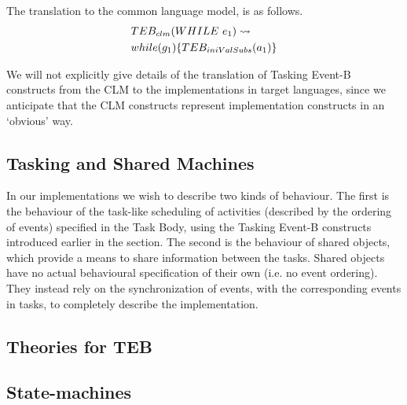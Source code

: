 The translation to the common language model, is as follows.
\begin{equation}
\begin{split}
&TEB_{clm}(WHILE~ e_1 ) \leadsto\\
& while(g_1)\{ TEB_{iniValSubs}(a_1) \}
\end{split}
\notag
\end{equation}

We will not explicitly give details of the translation of Tasking Event-B constructs from the CLM to the implementations in target languages, since we anticipate that the CLM constructs represent implementation constructs in an `obvious' way. 

\subsection{Tasking and Shared Machines}\label{tasks}
In our implementations we wish to describe two kinds of behaviour. The first is the behaviour of the task-like scheduling of activities (described by the ordering of events) specified in the Task Body, using the Tasking Event-B constructs introduced earlier in the section. The second is the behaviour of shared objects, which provide a means to share information between the tasks. Shared objects have no actual behavioural specification of their own (i.e. no event ordering). They instead rely on the synchronization of events, with the corresponding events in tasks, to completely describe the implementation. 

\subsection{Theories for TEB}

\subsection{State-machines}